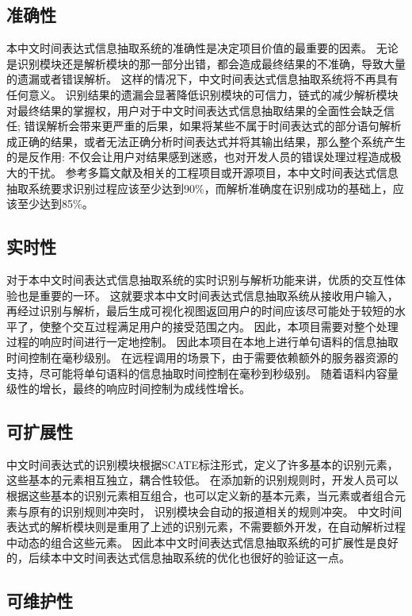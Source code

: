 \subsection{准确性}

本中文时间表达式信息抽取系统的准确性是决定项目价值的最重要的因素。 
无论是识别模块还是解析模块的那一部分出错，都会造成最终结果的不准确，导致大量的遗漏或者错误解析。 
这样的情况下，中文时间表达式信息抽取系统将不再具有任何意义。
识别结果的遗漏会显著降低识别模块的可信力，链式的减少解析模块对最终结果的掌握权，用户对于中文时间表达式信息抽取结果的全面性会缺乏信任;
错误解析会带来更严重的后果，如果将某些不属于时间表达式的部分语句解析成正确的结果，或者无法正确分析时间表达式并将其输出结果，那么整个系统产生的是反作用:
不仅会让用户对结果感到迷惑，也对开发人员的错误处理过程造成极大的干扰。 
参考多篇文献及相关的工程项目或开源项目，本中文时间表达式信息抽取系统要求识别过程应该至少达到90\%，而解析准确度在识别成功的基础上，应该至少达到85\%。

\subsection{实时性}

对于本中文时间表达式信息抽取系统的实时识别与解析功能来讲，优质的交互性体验也是重要的一环。 
这就要求本中文时间表达式信息抽取系统从接收用户输入，再经过识别与解析，最后生成可视化视图返回用户的时间应该尽可能处于较短的水平了，使整个交互过程满足用户的接受范围之内。
因此，本项目需要对整个处理过程的响应时间进行一定地控制。 因此本项目在本地上进行单句语料的信息抽取时间控制在毫秒级别。 
在远程调用的场景下，由于需要依赖额外的服务器资源的支持，尽可能将单句语料的信息抽取时间控制在毫秒到秒级别。 
随着语料内容量级性的增长，最终的响应时间控制为成线性增长。

\subsection{可扩展性}

中文时间表达式的识别模块根据SCATE标注形式，定义了许多基本的识别元素，这些基本的元素相互独立，耦合性较低。 
在添加新的识别规则时，开发人员可以根据这些基本的识别元素相互组合，也可以定义新的基本元素，当元素或者组合元素与原有的识别规则冲突时，
识别模块会自动的报道相关的规则冲突。
中文时间表达式的解析模块则是重用了上述的识别元素，不需要额外开发，在自动解析过程中动态的组合这些元素。 
因此本中文时间表达式信息抽取系统的可扩展性是良好的，后续本中文时间表达式信息抽取系统的优化也很好的验证这一点。


\subsection{可维护性}

